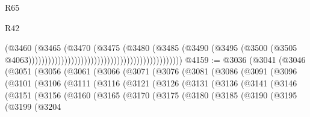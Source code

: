 \begin{lexlean}{R65}
\begin{lexlean}{R42}
\begin{coremodule}
{{{{{{{{{{{{{{{{{{{{{{{{{{{{{{{{{{{{{{{{{{{{{{{{{{{{{{{{{{{{{{{{{{{{{{{{{{{{{{{{{{{{{{{{{{{{{{{{{{{{{{{{{{{{{{{{{{{{{{{{{{{{{{{{{{{{{{{{{{{{{{{{{{{{{{{{{{{{{{{{{{{{{{{{{{{{{{{{{{{{{{{{                                                                              (@3460
                                                                                (@3465
                                                                                  (@3470
                                                                                    (@3475
                                                                                      (@3480
                                                                                        (@3485
                                                                                          (@3490
                                                                                            (@3495
                                                                                              (@3500
                                                                                                (@3505
                                                                                                  @4063)))))))))))))))))))))))))))))))))))))))))))))))
@4159 := @3036
    (@3041
      (@3046
        (@3051
          (@3056
            (@3061
              (@3066
                (@3071
                  (@3076
                    (@3081
                      (@3086
                        (@3091
                          (@3096
                            (@3101
                              (@3106
                                (@3111
                                  (@3116
                                    (@3121
                                      (@3126
                                        (@3131
                                          (@3136
                                            (@3141
                                              (@3146
                                                (@3151
                                                  (@3156
                                                    (@3160
                                                      (@3165
                                                        (@3170
                                                          (@3175
                                                            (@3180
                                                              (@3185
                                                                (@3190
                                                                  (@3195
                                                                    (@3199
                                                                      (@3204
}}}}}}}}}}}}}}}}}}}}}}}}}}}}}}}}}}}}}}}}}}}}}}}}}}}}}}}}}}}}}}}}}}}}}}}}}}}}}}}}}}}}}}}}}}}}}}}}}}}}}}}}}}}}}}}}}}}}}}}}}}}}}}}}}}}}}}}}}}}}}}}}}}}}}}}}}}}}}}}}}}}}}}}}}}}}}}}}}}}}}}}}
\end{coremodule}
\end{lexlean}
\end{lexlean}
